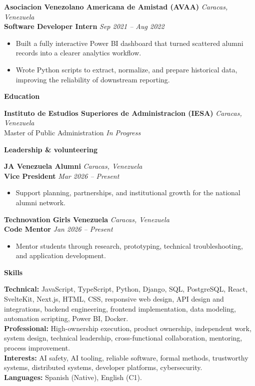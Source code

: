 \documentclass[11pt]{article}
\begin{document}
\textbf{Asociacion Venezolano Americana de Amistad (AVAA)} \hfill \textit{Caracas, Venezuela} \\
\textbf{Software Developer Intern} \hfill \textit{Sep 2021 -- Aug 2022}
\begin{itemize}
    \item Built a fully interactive Power BI dashboard that turned scattered alumni records into a clearer analytics workflow.
    \item Wrote Python scripts to extract, normalize, and prepare historical data, improving the reliability of downstream reporting.
\end{itemize}
\vspace{8pt}
\begin{center}
    \textbf{Education}
\end{center}
\vspace{-4pt}
\textbf{Instituto de Estudios Superiores de Administracion (IESA)} \hfill \textit{Caracas, Venezuela} \\
Master of Public Administration \hfill \textit{In Progress}
\vspace{8pt}
\begin{center}
    \textbf{Leadership \& volunteering}
\end{center}
\vspace{-4pt}
\textbf{JA Venezuela Alumni} \hfill \textit{Caracas, Venezuela} \\
\textbf{Vice President} \hfill \textit{Mar 2026 -- Present}
\begin{itemize}
    \item Support planning, partnerships, and institutional growth for the national alumni network.
\end{itemize}
\vspace{10pt}
\textbf{Technovation Girls Venezuela} \hfill \textit{Caracas, Venezuela} \\
\textbf{Code Mentor} \hfill \textit{Jan 2026 -- Present}
\begin{itemize}
    \item Mentor students through research, prototyping, technical troubleshooting, and application development.
\end{itemize}
\vspace{8pt}
\begin{center}
    \textbf{Skills}
\end{center}
\vspace{-4pt}
\textbf{Technical:} JavaScript, TypeScript, Python, Django, SQL, PostgreSQL, React, SvelteKit, Next.js, HTML, CSS, responsive web design, API design and integrations, backend engineering, frontend implementation, data modeling, automation scripting, Power BI, Docker.
\\[4pt]
\textbf{Professional:} High-ownership execution, product ownership, independent work, system design, technical leadership, cross-functional collaboration, mentoring, process improvement.
\\[4pt]
\textbf{Interests:} AI safety, AI tooling, reliable software, formal methods, trustworthy systems, distributed systems, developer platforms, cybersecurity.
\\[4pt]
\textbf{Languages:} Spanish (Native), English (C1).
\end{document}

